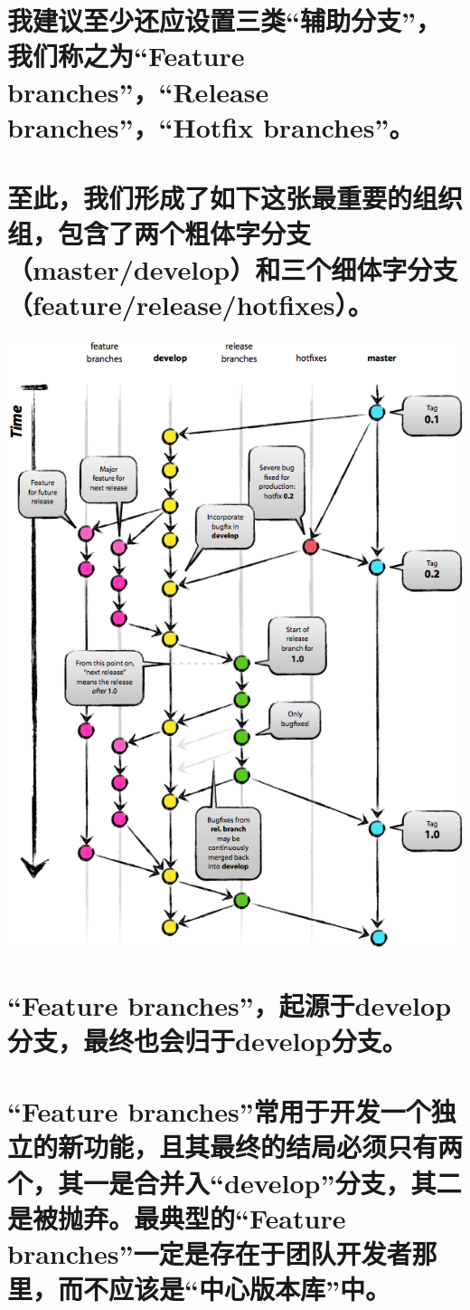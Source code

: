 \documentclass[11pt]{article}
\begin{document}
\section{我建议至少还应设置三类“辅助分支”，我们称之为“Feature branches”，“Release branches”，“Hotfix branches”。}
\label{sec-7}
\section{至此，我们形成了如下这张最重要的组织组，包含了两个粗体字分支（master/develop）和三个细体字分支（feature/release/hotfixes）。}
\label{sec-8}

\includegraphics[width=.9\linewidth]{images/105037.png}
\section{“Feature branches”，起源于develop分支，最终也会归于develop分支。}
\label{sec-9}
\section{“Feature branches”常用于开发一个独立的新功能，且其最终的结局必须只有两个，其一是合并入“develop”分支，其二是被抛弃。最典型的“Feature branches”一定是存在于团队开发者那里，而不应该是“中心版本库”中。}
\label{sec-10}
\end{document}
